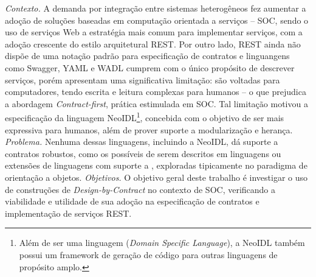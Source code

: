 
\vspace{5mm}

 
\vspace{5mm} 






\emph{Contexto.}
A demanda por integração entre sistemas heterogêneos fez aumentar a adoção de
soluções baseadas em computação orientada a serviços -- SOC, sendo o uso de
serviços Web a estratégia mais comum para implementar serviços, com a adoção crescente do estilo arquitetural REST.
Por outro lado, REST ainda não dispõe de uma notação padrão para especificação
de contratos e linguangens como Swagger, YAML e WADL cumprem com o
único propósito de descrever serviços, porém apresentam uma significativa
limitação: são voltadas para computadores, tendo escrita e leitura complexas para
humanos -- o que prejudica a abordagem \textit{Contract-first}, prática
estimulada em SOC. Tal limitação motivou a especificação da
linguagem NeoIDL\footnote{Além de ser uma linguagem (\textit{Domain Specific
Language}), a NeoIDL também possui um framework de geração de código para outras linguagens de propósito
amplo.}, concebida com o objetivo de ser mais expressiva para humanos,
além de prover suporte a modularização e herança.
\emph{Problema.} Nenhuma dessas linguagens, incluindo a NeoIDL, dá
suporte a contratos robustos, como os possíveis de serem descritos em
linguagens ou extensões de linguagens com suporte a \designbycontract{},
exploradas tipicamente no paradigma de orientação a objetos.
\emph{Objetivos.}
O objetivo geral deste trabalho é investigar o uso de construções de
\textit{Design-by-Contract} no contexto de SOC,
verificando a viabilidade e utilidade de sua adoção na especificação de
contratos e implementação de serviços REST.
%
